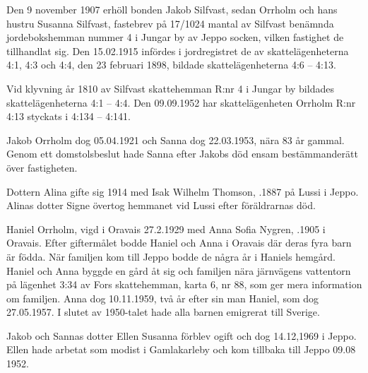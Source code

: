 Den 9 november 1907 erhöll bonden Jakob Silfvast, sedan Orrholm och hans hustru Susanna Silfvast, fastebrev på 17/1024 mantal av Silfvast benämnda jordebokshemman nummer 4 i Jungar by av Jeppo socken, vilken fastighet de tillhandlat sig.
Den 15.02.1915 infördes i jordregistret de av skattelägenheterna 4:1, 4:3 och 4:4, den 23 februari 1898, bildade skattelägenheterna 4:6 – 4:13.

Vid klyvning år 1810 av Silfvast skattehemman R:nr 4 i Jungar by bildades skattelägenheterna 4:1 – 4:4. Den 09.09.1952 har skattelägenheten Orrholm R:nr 4:13 styckats i 4:134 – 4:141.
\begin{jhchildren}
  \item {}
  \item {}
  \item {}
  \item {}
  \item {}
  \item {}
  \item {}
  \item {}
  \item {}
\end{jhchildren}
Jakob Orrholm dog 05.04.1921 och Sanna dog 22.03.1953, nära 83 år gammal. Genom ett domstolsbeslut hade Sanna efter Jakobs död ensam bestämmanderätt över fastigheten.

Dottern Alina gifte sig 1914 med Isak Wilhelm Thomson, .1887 på Lussi i Jeppo. Alinas dotter Signe övertog hemmanet vid Lussi efter föräldrarnas död.

Haniel Orrholm, vigd i Oravais 27.2.1929 med Anna Sofia Nygren, .1905 i Oravais. Efter giftermålet bodde Haniel och Anna i Oravais där deras fyra barn är födda. När familjen kom till Jeppo bodde de några år i Haniels hemgård. Haniel och Anna byggde en gård åt sig och familjen nära järnvägens vattentorn på lägenhet 3:34 av Fors skattehemman, karta 6, nr 88, som ger mera information om familjen. Anna dog 10.11.1959, två år efter sin man Haniel, som dog 27.05.1957.  I slutet av 1950-talet hade alla barnen emigrerat till Sverige.

Jakob och Sannas dotter Ellen Susanna förblev ogift och dog 14.12,1969 i Jeppo. Ellen hade arbetat som modist i Gamlakarleby och kom tillbaka till Jeppo 09.08 1952.

